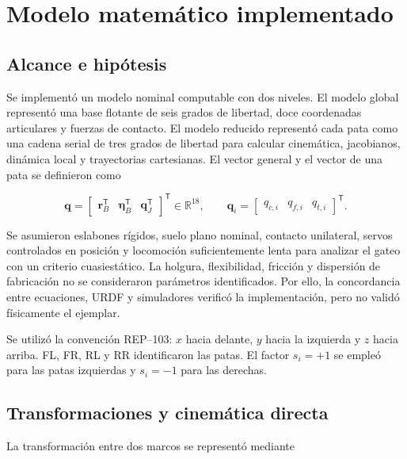 \chapter{Modelo matemático implementado}
\label{cap:modelo}

\section{Alcance e hipótesis}

Se implementó un modelo nominal computable con dos niveles. El modelo global
representó una base flotante de seis grados de libertad, doce coordenadas
articulares y fuerzas de contacto. El modelo reducido representó cada pata como
una cadena serial de tres grados de libertad para calcular cinemática,
jacobianos, dinámica local y trayectorias cartesianas. El vector general y el
vector de una pata se definieron como

\begin{equation}
\mathbf q=
\begin{bmatrix}\mathbf r_B^{\mathsf T}&\boldsymbol\eta_B^{\mathsf T}&
\mathbf q_J^{\mathsf T}\end{bmatrix}^{\mathsf T}\in\mathbb R^{18},
\qquad
\mathbf q_i=\begin{bmatrix}q_{c,i}&q_{f,i}&q_{t,i}\end{bmatrix}^{\mathsf T}.
\label{eq:model-levels}
\end{equation}

Se asumieron eslabones rígidos, suelo plano nominal, contacto unilateral,
servos controlados en posición y locomoción suficientemente lenta para analizar
el gateo con un criterio cuasiestático. La holgura, flexibilidad, fricción y
dispersión de fabricación no se consideraron parámetros identificados. Por
ello, la concordancia entre ecuaciones, URDF y simuladores verificó la
implementación, pero no validó físicamente el ejemplar.

Se utilizó la convención REP--103: $x$ hacia delante, $y$ hacia la izquierda y
$z$ hacia arriba. FL, FR, RL y RR identificaron las patas. El factor
$s_i=+1$ se empleó para las patas izquierdas y $s_i=-1$ para las derechas.

\section{Transformaciones y cinemática directa}

La transformación entre dos marcos se representó mediante

